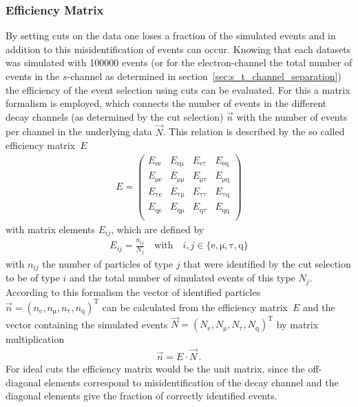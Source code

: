 \documentclass[11pt, a4paper]{article}
\numberwithin{equation}{section}
\begin{document}
\subsubsection{Efficiency Matrix}
\label{sec:efficiency_matrix}
By setting cuts on the data one loses a fraction of the simulated events and in addition to this misidentification of events can occur.
Knowing that each datasets was simulated with \num{100000} events (or for the electron-channel the total number of events in the $s$-channel as determined in section~\ref{sec:s_t_channel_separation}) the efficiency of the event selection using cuts can be evaluated.
For this a matrix formalism is employed, which connects the number of events in the different decay channels (as determined by the cut selection) $\vec{n}$ with the number of events per channel in the underlying data $\vec{N}$.
This relation is described by the so called efficiency matrix~$E$
\begin{align*}
	E = \begin{pmatrix}
		E_{\mathrm{e e}} & E_{\mathrm{e \mu}} & E_{\mathrm{e \tau}} & E_{\mathrm{e q}} \\
		E_{\mathrm{\mu e}} & E_{\mathrm{\mu \mu}} & E_{\mathrm{\mu \tau}} & E_{\mathrm{\mu q}} \\
		E_{\mathrm{\tau e}} & E_{\mathrm{\tau \mu}} & E_{\mathrm{\tau \tau}} & E_{\mathrm{\tau q}} \\
		E_{\mathrm{q e}} & E_{\mathrm{q \mu}} & E_{\mathrm{q \tau}} & E_{\mathrm{q q}} \\
	\end{pmatrix}
\end{align*}
with matrix elements $E_{ij}$, which are defined by
\begin{align}
	E_{ij} = \frac{n_{ij}}{N_j} \quad \text{with} \quad i,j \in \{ \mathrm{e}, \mathrm{\mu}, \mathrm{\tau}, \mathrm{q} \}
	\label{eq:efficiency_matrix_elements}
\end{align}
with $n_{ij}$ the number of particles of type $j$ that were identified by the cut selection to be of type $i$ and the total number of simulated events of this type $N_j$.
According to this formalism the vector of identified particles $\vec{n} = (n_\mathrm{e}, n_\mathrm{\mu}, n_\mathrm{\tau}, n_\mathrm{q})^\mathrm{T}$ can be calculated from the efficiency matrix~$E$ and the vector containing the simulated events $\vec{N} = (N_\mathrm{e}, N_\mathrm{\mu}, N_\mathrm{\tau}, N_\mathrm{q})^\mathrm{T}$ by matrix multiplication
\begin{align}
	\vec{n} = E \cdot \vec{N} \,\text{.}
	\label{eq:efficiency_definition}
\end{align}
For ideal cuts the efficiency matrix would be the unit matrix, since the off-diagonal elements correspond to misidentification of the decay channel and the diagonal elements give the fraction of correctly identified events.
\end{document}
